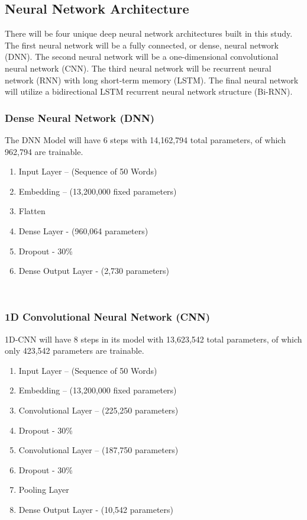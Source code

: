 \documentclass[5p,authoryear]{elsarticle}
\begin{document}
\subsection{Neural Network Architecture}\label{arch}

There will be four unique deep neural network architectures built in this study. The first neural network will be a fully connected, or dense, neural network (DNN). The second neural network will be a one-dimensional convolutional neural network (CNN). The third neural network will be recurrent neural network (RNN) with long short-term memory (LSTM). The final neural network will utilize a bidirectional LSTM recurrent neural network structure (Bi-RNN).

\subsubsection{Dense Neural Network (DNN)}\label{dnn}

The DNN Model will have 6 steps with 14,162,794 total parameters, of which 962,794 are trainable.

\begin{enumerate}
 \item Input Layer – (Sequence of 50 Words)
 \item Embedding – (13,200,000 fixed parameters)
 \item Flatten
 \item Dense Layer - (960,064 parameters)
 \item Dropout - 30\%
 \item Dense Output Layer - (2,730 parameters)
\end{enumerate} \\

\subsubsection{1D Convolutional Neural Network (CNN)}\label{cnn}

1D-CNN will have 8 steps in its model with 13,623,542 total parameters, of which only 423,542 parameters are trainable.

\begin{enumerate}
 \item Input Layer – (Sequence of 50 Words)
 \item Embedding – (13,200,000 fixed parameters)
 \item Convolutional Layer – (225,250 parameters)
 \item Dropout - 30\%
 \item Convolutional Layer – (187,750 parameters)
 \item Dropout - 30\%
 \item Pooling Layer
 \item Dense Output Layer - (10,542 parameters)
\end{enumerate} \\
\end{document}
